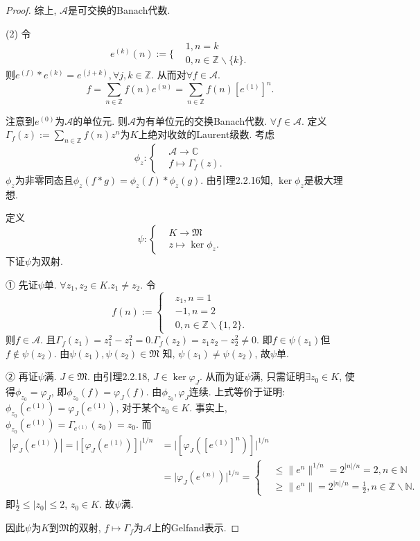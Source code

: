 \documentclass[UTF8,twoside]{ctexbook}
\newcommand{\h}{\mathscr}
\newcommand{\kx}{\mathbb}
\numberwithin{equation}{section}
\begin{document}
\begin{proof}
		综上, $\h A$是可交换的Banach代数.

		(2) 令
		\[
		e^{(k)}(n):=\Biggl\{
		\begin{aligned}
		&1,n=k\\
		&0,n\in \kx Z\backslash\{k\}.
		\end{aligned}
		\]
		则$e^{(f)}*e^{(k)}=e^{(j+k)},\forall j,k\in\kx Z$. 从而对$\forall f\in\h A$.
		\[
		f=\sum_{n\in\kx Z}f(n)e^{(n)}=
		\sum_{n\in\kx Z}f(n)[e^{(1)}]^n.
		\]

		注意到$e^{(0)}$为$\h A$的单位元. 则$\h A$为有单位元的交换Banach代数. $\forall f\in\h A$. 定义$\Gamma_f(z):=\sum_{n\in\kx Z}f(n)z^n$为$K$上绝对收敛的Laurent级数. 考虑
		\[
		\phi_z:\left\{
		\begin{aligned}
		&\h A\rightarrow\kx C\\
		& f\mapsto \Gamma_f(z).
		\end{aligned}
		\right.
		\]
		$\phi_z$为非零同态且$\phi_z(f*g)=\phi_z(f)*\phi_z(g)$. 由引理2.2.16知, $\ker\phi_z$是极大理想.

		定义
		\[
		\psi:\left\{
		\begin{aligned}
		&K\rightarrow \mathfrak M\\
		& z\mapsto \ker \phi_z.
		\end{aligned}
		\right.
		\]
		下证$\psi$为双射.

		① 先证$\psi$单. $\forall z_1,z_2\in K. z_1\neq z_2$. 令
		\[
		f(n):=\left\{
		\begin{aligned}
		&z_1,n=1\\
		&-1,n=2\\
		&0,n\in\kx Z\backslash\{1,2\}.
		\end{aligned}
		\right.
		\]
		则$f\in\h A$. 且$\Gamma_f(z_1)=z_1^2-z_1^2=0. \Gamma_f(z_2)=z_1z_2-z_2^2\neq 0$. 即$f\in\psi(z_1)$但$f\notin\psi(z_2)$. 由$\psi(z_1),\psi(z_2)\in\mathfrak M$ 知, $\psi(z_1)\neq\psi(z_2)$, 故$\psi$单.

		② 再证$\psi$满. $J\in\mathfrak M$. 由引理2.2.18, $J\in\ker\varphi_J$. 从而为证$\psi$满, 只需证明$\exists z_0\in K$, 使得$\phi_{z_0}=\varphi_J$, 即$\phi_{z_0}(f)=\varphi_J(f)$. 由$\phi_{z_0},\varphi_J$连续. 上式等价于证明: $\phi_{z_0}(e^{(1)})=\varphi_J(e^{(1)})$, 对于某个$z_0\in K$. 事实上, $\phi_{z_0}(e^{(1)})=\Gamma_{e^{(1)}}(z_0)=z_0$. 而
		\[
		\begin{aligned}
		|\varphi_J(e^{(1)})|=\big|[\varphi_J(e^{(1)})]\big|^{1/n}
		&=\big|[\varphi_J([e^{(1)}]^n)]\big|^{1/n}\\
		&=\big|\varphi_J(e^{(n)})\big|^{1/n}=
		\left\{
		\begin{aligned}
		&\leq \|e^n\|^{1/n}=2^{|n|/n}=2,n\in\kx N\\
		&\geq \|e^n\|=2^{|n|/n}=\frac{1}{2},n\in\kx Z\backslash\kx N.
		\end{aligned}
		\right.
		\end{aligned}
		\]
		即$\frac{1}{2}\leq |z_0|\leq 2$, $z_0\in K$. 故$\psi$满.

		因此$\psi$为$K$到$\mathfrak M$的双射, $f\mapsto\Gamma_f$为$\h A$上的Gelfand表示.
	\end{proof}
\end{document}
